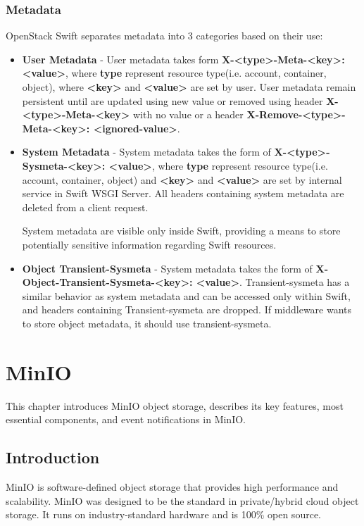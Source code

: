     \subsection{Metadata}
    OpenStack Swift separates metadata into 3 categories based on their use:
    \begin{itemize}
        \item \textbf{User Metadata} - User metadata takes form \textbf{X-<type>-Meta-<key>: <value>}, where \textbf{type} represent resource type(i.e. account, container, object), where \textbf{<key>} and \textbf{<value>} are set by user. User metadata remain persistent until are updated using new value or removed using header  \textbf{X-<type>-Meta-<key>} with no value or a header \textbf{X-Remove-<type>-Meta-<key>: <ignored-value>}.
        \item \textbf{System Metadata} - System metadata takes the form of \textbf{X-<type>-Sysmeta-<key>: <value>}, where \textbf{type} represent resource type(i.e. account, container, object) and \textbf{<key>} and \textbf{<value>} are set by internal service in Swift WSGI Server.
        All headers containing system metadata are deleted from a client request.

        System metadata are visible only inside Swift, providing a means to store potentially sensitive information regarding Swift resources.
        \item \textbf{Object Transient-Sysmeta} - System metadata takes the form of \textbf{X-Object-Transient-Sysmeta-<key>: <value>}. Transient-sysmeta has a similar behavior as system metadata and can be accessed only within Swift, and headers containing Transient-sysmeta are dropped. If middleware wants to store object metadata, it should use transient-sysmeta\cite{swiftMiddleware}.
    \end{itemize}

\chapter{MinIO}\label{chap:minio}
This chapter introduces MinIO object storage, describes its key features, most essential components, and event notifications in MinIO.

\section{Introduction}
    MinIO is software-defined object storage that provides high performance and scalability. MinIO was designed to be the standard in private/hybrid cloud object storage.
    It runs on industry-standard hardware and is 100\% open source\cite{minioObjectStorage}.

